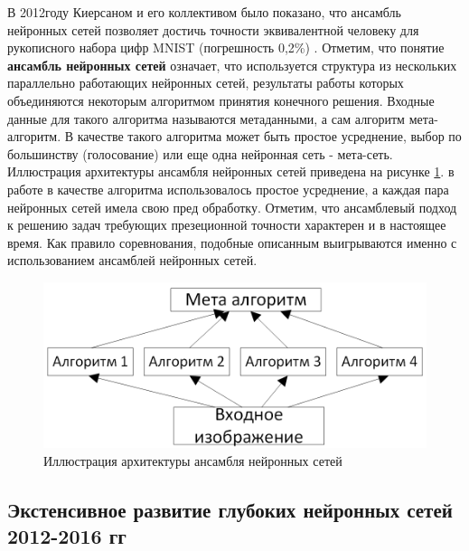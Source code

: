 \documentclass[12pt]{article}
\begin{document}
\begin{sloppypar}
В 2012году Киерсаном и его коллективом было показано, что ансамбль нейронных сетей позволяет достичь точности эквивалентной человеку для рукописного набора цифр MNIST (погрешность 0,2\%) \cite{ciregan2012multi}. Отметим, что понятие \textbf{ансамбль нейронных сетей} означает, что используется структура из нескольких параллельно работающих нейронных сетей, результаты работы которых объединяются некоторым алгоритмом принятия конечного решения. Входные данные для такого алгоритма называются метаданными, а сам алгоритм мета-алгоритм. В качестве такого алгоритма может быть простое усреднение, выбор по большинству (голосование) или еще одна нейронная сеть - мета-сеть. Иллюстрация архитектуры ансамбля нейронных сетей приведена на рисунке \ref{ch1:fig:ensemble}. в работе \cite{ciregan2012multi} в качестве алгоритма использовалось простое усреднение, а каждая пара нейронных сетей имела свою пред обработку. Отметим, что ансамблевый подход к решению задач требующих презеционной точности характерен и в настоящее время. Как правило соревнования, подобные описанным выигрываются именно с использованием ансамблей нейронных сетей.

\begin{figure}[!h]
	\begin{center}
		\includegraphics[width=0.7\linewidth]{./figuresch1/Ensemble.png}
		\caption{Иллюстрация архитектуры ансамбля нейронных сетей}		
		\label{ch1:fig:ensemble}
	\end{center}
\end{figure}

\newpage
\subsection{Экстенсивное развитие глубоких нейронных сетей 2012-2016 гг }

\end{sloppypar}
\end{document}
